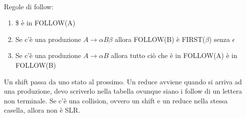 \\ Regole di follow: 
\begin{enumerate}
    \item \$ è in FOLLOW(A)
    \item Se c'è una produzione $A \rightarrow \alpha B \beta$ allora FOLLOW(B) è FIRST($\beta$) senza $\epsilon$
    \item Se c'è una produzione $A \rightarrow \alpha B$ allora tutto ciò che è in FOLLOW(A) è in FOLLOW(B)
\end{enumerate}
Un shift passa da uno stato al prossimo.
Un reduce avviene quando si arriva ad una produzione, devo scriverlo nella tabella 
ovunque siano i follow di un lettera non terminale. 
Se c'è una collision, ovvero un shift e un reduce nella stessa casella, allora 
non è SLR.

